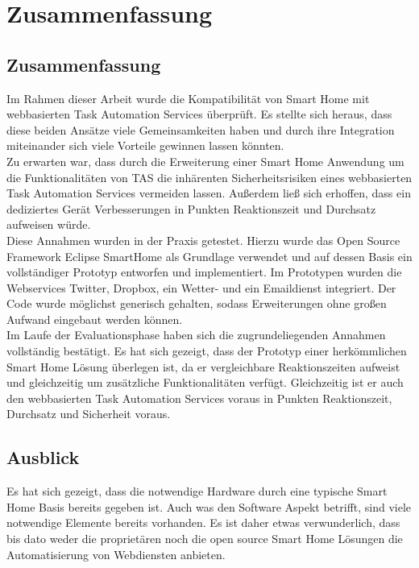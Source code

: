 \chapter{Zusammenfassung}
\label{chap:ausblick}

\section{Zusammenfassung}
Im Rahmen dieser Arbeit wurde die Kompatibilität von Smart Home mit webbasierten Task Automation Services überprüft. Es stellte sich heraus, dass diese beiden Ansätze viele Gemeinsamkeiten haben und durch ihre Integration miteinander sich viele Vorteile gewinnen lassen könnten.\\

Zu erwarten war, dass durch die Erweiterung einer Smart Home Anwendung um die Funktionalitäten von TAS die inhärenten Sicherheitsrisiken eines webbasierten Task Automation Services vermeiden lassen. Außerdem ließ sich erhoffen, dass ein dediziertes Gerät Verbesserungen in Punkten Reaktionszeit und Durchsatz aufweisen würde.\\

Diese Annahmen wurden in der Praxis getestet. Hierzu wurde das Open Source Framework Eclipse SmartHome als Grundlage verwendet und auf dessen Basis ein vollständiger Prototyp entworfen und implementiert. Im Prototypen wurden die Webservices Twitter, Dropbox, ein Wetter- und ein Emaildienst integriert. Der Code wurde möglichst generisch gehalten, sodass Erweiterungen ohne großen Aufwand eingebaut werden können.\\

Im Laufe der Evaluationsphase haben sich die zugrundeliegenden Annahmen vollständig bestätigt. Es hat sich gezeigt, dass der Prototyp einer herkömmlichen Smart Home Lösung überlegen ist, da er vergleichbare Reaktionszeiten aufweist und gleichzeitig um zusätzliche Funktionalitäten verfügt. Gleichzeitig ist er auch den webbasierten Task Automation Services voraus in Punkten Reaktionszeit, Durchsatz und Sicherheit voraus.






\section{Ausblick}
Es hat sich gezeigt, dass die notwendige Hardware durch eine typische Smart Home Basis bereits gegeben ist. Auch was den Software Aspekt betrifft, sind viele notwendige Elemente bereits vorhanden. Es ist daher etwas verwunderlich, dass bis dato weder die proprietären noch die open source Smart Home Lösungen die Automatisierung von Webdiensten anbieten. 

